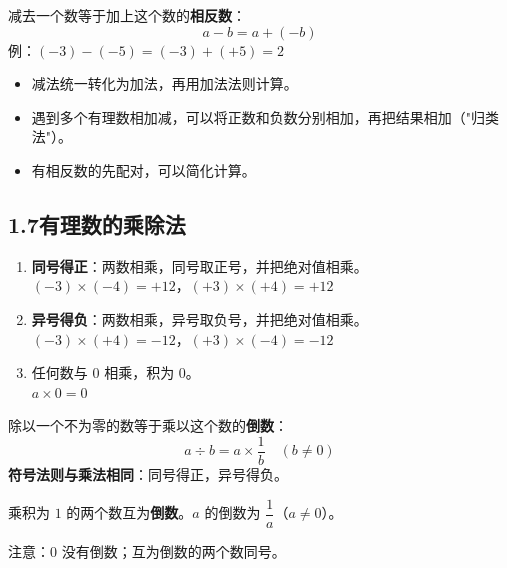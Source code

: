\documentclass[12pt, a4paper]{ctexart}
\begin{document}
\begin{knowledgebox}[有理数减法法则]
减去一个数等于加上这个数的\textbf{相反数}：
\[
a - b = a + (-b)
\]
例：$(-3) - (-5) = (-3) + (+5) = 2$
\end{knowledgebox}

\begin{tipbox}[加减法的运算技巧]
\begin{itemize}[leftmargin=*]
  \item 减法统一转化为加法，再用加法法则计算。
  \item 遇到多个有理数相加减，可以将正数和负数分别相加，再把结果相加（"归类法"）。
  \item 有相反数的先配对，可以简化计算。
\end{itemize}
\end{tipbox}

\subsection*{1.7\quad 有理数的乘除法}

\begin{knowledgebox}[有理数乘法法则]
\begin{enumerate}[leftmargin=*]
  \item \textbf{同号得正}：两数相乘，同号取正号，并把绝对值相乘。\\
  $(-3) \times (-4) = +12$，$(+3) \times (+4) = +12$
  \item \textbf{异号得负}：两数相乘，异号取负号，并把绝对值相乘。\\
  $(-3) \times (+4) = -12$，$(+3) \times (-4) = -12$
  \item 任何数与 $0$ 相乘，积为 $0$。\\
  $a \times 0 = 0$
\end{enumerate}
\end{knowledgebox}

\begin{knowledgebox}[有理数除法法则]
除以一个不为零的数等于乘以这个数的\textbf{倒数}：
\[
a \div b = a \times \frac{1}{b} \quad (b \neq 0)
\]
\textbf{符号法则与乘法相同}：同号得正，异号得负。
\end{knowledgebox}

\begin{tipbox}[倒数的概念]
乘积为 $1$ 的两个数互为\textbf{倒数}。$a$ 的倒数为 $\dfrac{1}{a}$（$a \neq 0$）。

注意：$0$ 没有倒数；互为倒数的两个数同号。
\end{tipbox}
\end{document}
